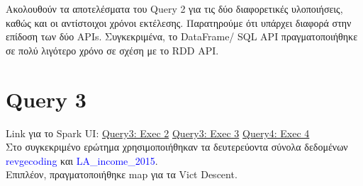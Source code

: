 \documentclass{article}
\begin{document}
Ακολουθούν τα αποτελέσματα του Query 2 για τις δύο διαφορετικές υλοποιήσεις, καθώς και οι αντίστοιχοι χρόνοι εκτέλεσης. Παρατηρούμε ότι υπάρχει διαφορά στην επίδοση των δύο APIs. Συγκεκριμένα, το DataFrame/ SQL API πραγματοποιήθηκε σε πολύ λιγότερο χρόνο σε σχέση με το RDD API. 
    

\section{Query 3}

Link για το Spark UI: 
\href{http://83.212.81.191:18080/history/application_1705357398960_0014/jobs/} {Query3: Exec 2} 
\href{http://83.212.81.191:18080/history/application_1705357398960_0015/jobs/} {Query3: Exec 3} 
\href{http://83.212.81.191:18080/history/application_1705357398960_0016/jobs/} {Query4: Exec 4} \\
Στο συγκεκριμένο ερώτημα χρησιμοποιήθηκαν τα δευτερεύοντα σύνολα δεδομένων 
\textcolor{blue}{revgecoding} και \textcolor{blue}{LA\_income\_2015}. \\
Επιπλέον, πραγματοποιήθηκε map για τα Vict  Descent. \\
\end{document}
